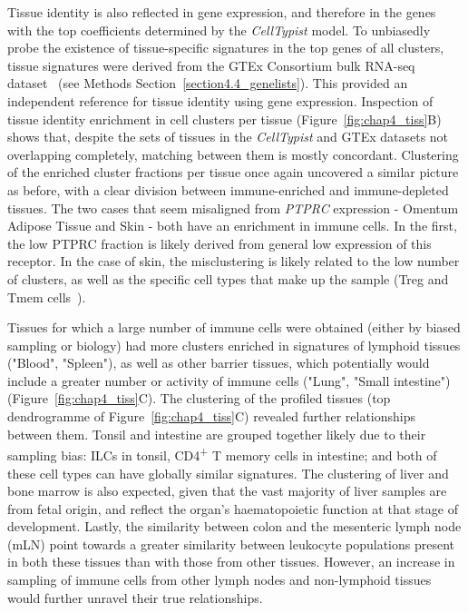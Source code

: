 Tissue identity is also reflected in gene expression, and therefore in the genes with the top coefficients determined by the \textit{CellTypist} model. To unbiasedly probe the existence of tissue-specific signatures in the top genes of all clusters, tissue signatures were derived from the GTEx Consortium bulk RNA-seq dataset~\citep{consortium_genotype-tissue_2015} (see Methods Section~\ref{section4.4_genelists}). This provided an independent reference for tissue identity using gene expression. Inspection of tissue identity enrichment in cell clusters per tissue (Figure~\ref{fig:chap4_tiss}B) shows that, despite the sets of tissues in the \textit{CellTypist} and GTEx datasets not overlapping completely, matching between them is mostly concordant. Clustering of the enriched cluster fractions per tissue once again uncovered a similar picture as before, with a clear division between immune-enriched and immune-depleted tissues. The two cases that seem misaligned from \textit{PTPRC} expression - Omentum Adipose Tissue and Skin - both have an enrichment in immune cells. In the first, the low PTPRC fraction is likely derived from general low expression of this receptor. In the case of skin, the misclustering is likely related to the low number of clusters, as well as the specific cell types that make up the sample (Treg and Tmem cells~\citep{miragaia_single-cell_2019}). 

Tissues for which a large number of immune cells were obtained (either by biased sampling or biology) had more clusters enriched in signatures of lymphoid tissues  ("Blood", "Spleen"), as well as other barrier tissues, which potentially would include a greater number or activity of immune cells ("Lung", "Small intestine") (Figure~\ref{fig:chap4_tiss}C). The clustering of the profiled tissues (top dendrogramme of Figure~\ref{fig:chap4_tiss}C) revealed further relationships between them. Tonsil and intestine are grouped together likely due to their sampling bias: ILCs in tonsil, CD4\textsuperscript{+} T memory cells in intestine; and both of these cell types can have globally similar signatures. The clustering of liver and bone marrow is also expected, given that the vast majority of liver samples are from fetal origin, and reflect the organ's haematopoietic function at that stage of development. Lastly, the similarity between colon and the mesenteric lymph node (mLN) point towards a greater similarity between leukocyte populations present in both these tissues than with those from other tissues. However, an increase in sampling of immune cells from other lymph nodes and non-lymphoid tissues would further unravel their true relationships.

